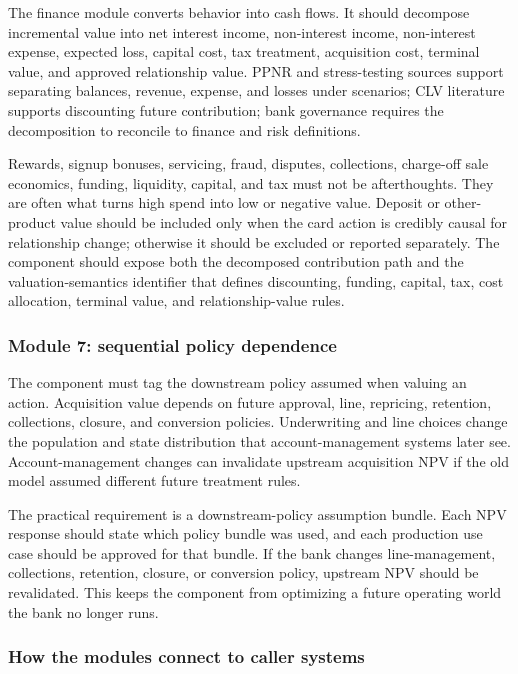 \documentclass[11pt]{article}
\newcommand{\1}{\mathbf{1}}
\begin{document}
The finance module converts behavior into cash flows. It should decompose
incremental value into net interest income, non-interest income, non-interest
expense, expected loss, capital cost, tax treatment, acquisition cost, terminal
value, and approved relationship value. PPNR and stress-testing sources
support separating balances, revenue, expense, and losses under scenarios; CLV
literature supports discounting future contribution; bank governance requires
the decomposition to reconcile to finance and risk definitions.

Rewards, signup bonuses, servicing, fraud, disputes, collections, charge-off
sale economics, funding, liquidity, capital, and tax must not be afterthoughts.
They are often what turns high spend into low or negative value. Deposit or
other-product value should be included only when the card action is credibly
causal for relationship change; otherwise it should be excluded or reported
separately. The component should expose both the decomposed contribution path
and the valuation-semantics identifier that defines discounting, funding,
capital, tax, cost allocation, terminal value, and relationship-value rules.

\subsubsection{Module 7: sequential policy dependence}
\label{subsec:module-policy}

The component must tag the downstream policy assumed when valuing an action.
Acquisition value depends on future approval, line, repricing, retention,
collections, closure, and conversion policies. Underwriting and line choices
change the population and state distribution that account-management systems
later see. Account-management changes can invalidate upstream acquisition NPV
if the old model assumed different future treatment rules.

The practical requirement is a downstream-policy assumption bundle. Each NPV
response should state which policy bundle was used, and each production use
case should be approved for that bundle. If the bank changes line-management,
collections, retention, closure, or conversion policy, upstream NPV should be
revalidated. This keeps the component from optimizing a future operating world
the bank no longer runs.

\subsubsection{How the modules connect to caller systems}
\label{subsec:modules-to-callers}
\end{document}

